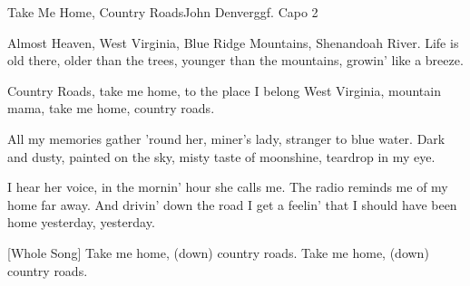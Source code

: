 \begin{song}{Take Me Home, Country Roads}{John Denver}{ggf. Capo 2}

Almost Heaven, West Virginia, Blue Ridge Mountains, Shenandoah River.
Life is old there, older than the trees, younger than the mountains, growin'
like a breeze.

Country Roads, take me home, to the place I belong
West Virginia, mountain mama, take me home, country roads.

All my memories  gather 'round her, miner's lady, stranger to blue water.
Dark and dusty, painted on the sky, misty taste of moonshine,
teardrop in my eye.

 

I hear her voice, in the mornin' hour she calls me.
The radio reminds me of my home far away.
And drivin' down the road I get a feelin' that I should have been home
yesterday, yesterday.

 

[Whole Song]
Take me home, (down) country roads.
Take me home, (down) country roads.

\end{song}